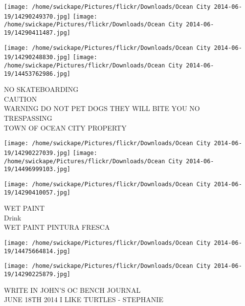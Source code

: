 \documentclass[10pt,letterpaper]{article}
\begin{document}
\texttt{[image: /home/swickape/Pictures/flickr/Downloads/Ocean City 2014-06-19/14290249370.jpg]}
\texttt{[image: /home/swickape/Pictures/flickr/Downloads/Ocean City 2014-06-19/14290411487.jpg]}

\texttt{[image: /home/swickape/Pictures/flickr/Downloads/Ocean City 2014-06-19/14290248830.jpg]}
\texttt{[image: /home/swickape/Pictures/flickr/Downloads/Ocean City 2014-06-19/14453762986.jpg]}

NO SKATEBOARDING\\
CAUTION\\
WARNING DO NOT PET DOGS THEY WILL BITE YOU NO TRESPASSING\\
TOWN OF OCEAN CITY PROPERTY\\
\pagebreak

\texttt{[image: /home/swickape/Pictures/flickr/Downloads/Ocean City 2014-06-19/14290227039.jpg]}
\texttt{[image: /home/swickape/Pictures/flickr/Downloads/Ocean City 2014-06-19/14496999103.jpg]}

\texttt{[image: /home/swickape/Pictures/flickr/Downloads/Ocean City 2014-06-19/14290410057.jpg]}

WET PAINT\\
Drink\\
WET PAINT PINTURA FRESCA\\
\pagebreak

\texttt{[image: /home/swickape/Pictures/flickr/Downloads/Ocean City 2014-06-19/14475664814.jpg]}

\vspace{0.25in}
\texttt{[image: /home/swickape/Pictures/flickr/Downloads/Ocean City 2014-06-19/14290225879.jpg]}

WRITE IN JOHN'S OC BENCH JOURNAL\\
JUNE 18TH 2014 I LIKE TURTLES {-} STEPHANIE\\
\pagebreak
\end{document}
